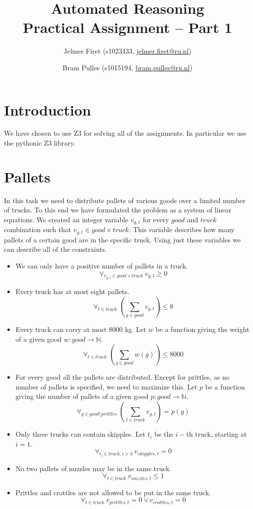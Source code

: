 \documentclass{scrartcl}
\author{Jelmer Firet (s1023433, \href{mailto:jelmer.firet@ru.nl}{jelmer.firet@ru.nl}) \and
Bram Pulles (s1015194, \href{mailto:bram.pulles@ru.nl}{bram.pulles@ru.nl})}
\title{\textbf{Automated Reasoning\\Practical Assignment -- Part 1}}
\begin{document}
\maketitle

\section{Introduction}
We have chosen to use Z3 for solving all of the assignments. In particular we
use the pythonic Z3 library.

\section{Pallets}
In this task we need to distribute pallets of various goods over a limited
number of trucks. To this end we have formulated the problem as a system of
linear equations. We created an integer variable $v_{g,t}$ for every $good$ and
$truck$ combination such that $v_{g,t} \in good \times truck$. This variable
describes how many pallets of a certain good are in the specific truck. Using
just these variables we can describe all of the constraints.

\begin{itemize}
	\item
		We can only have a positive number of pallets in a truck.
		\[ \forall_{v_{g,t} \in good \times truck}\ v_{g,t} \geq 0 \]
	\item
		Every truck has at most eight pallets.
		\[ \forall_{t \in truck}\ \left( \sum_{g \in good} v_{g,t} \right) \leq 8 \]
	\item
		Every truck can carry at most 8000 kg. Let $w$ be a function giving the
		weight of a given good $w: good \to \mathbb{N}$.
		\[ \forall_{t \in truck}\ \left( \sum_{g \in good} w(g) \right) \leq 8000 \]
	\item
		For every good all the pallets are distributed. Except for prittles, as
		no number of pallets is specified, we need to maximize this. Let $p$ be
		a function giving the number of pallets of a given good $p: good \to
		\mathbb{N}$.
		\[
		\forall_{g \in good \setminus prittles}\
		\left( \sum_{t \in truck} v_{g,t} \right) = p(g)
		\]
	\item
		Only three trucks can contain skipples. Let $t_i$ be the $i-$th truck,
		starting at $i = 1$.
		\[ \forall_{t_i \in truck, i > 3 }\ v_{skipples,t} = 0 \]
	\item
		No two pallets of nuzzles may be in the same truck.
		\[ \forall_{t \in truck}\ v_{nuzzles,t} \leq 1 \]
	\item
		Prittles and crottles are not allowed to be put in the same truck.
		\[ \forall_{t \in truck}\ v_{prittles,t} = 0 \lor v_{crottles,t} = 0 \]
\end{itemize}
\end{document}
